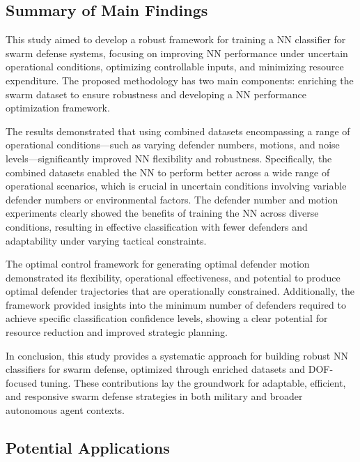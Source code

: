 \documentclass[journal]{IEEEtran} %
\begin{document}
\subsection{Summary of Main Findings}


This study aimed to develop a robust framework for training a NN classifier for swarm defense systems, focusing on improving NN performance under uncertain operational conditions, optimizing controllable inputs, and minimizing resource expenditure. The proposed methodology has two main components: enriching the swarm dataset to ensure robustness and developing a NN performance optimization framework.

The results demonstrated that using combined datasets encompassing a range of operational conditions—such as varying defender numbers, motions, and noise levels—significantly improved NN flexibility and robustness. Specifically, the combined datasets enabled the NN to perform better across a wide range of operational scenarios, which is crucial in uncertain conditions involving variable defender numbers or environmental factors. The defender number and motion experiments clearly showed the benefits of training the NN across diverse conditions, resulting in effective classification with fewer defenders and adaptability under varying tactical constraints.

The optimal control framework for generating optimal defender motion demonstrated its flexibility, operational effectiveness, and potential to produce optimal defender trajectories that are operationally constrained. Additionally, the framework provided insights into the minimum number of defenders required to achieve specific classification confidence levels, showing a clear potential for resource reduction and improved strategic planning.

In conclusion, this study provides a systematic approach for building robust NN classifiers for swarm defense, optimized through enriched datasets and DOF-focused tuning. These contributions lay the groundwork for adaptable, efficient, and responsive swarm defense strategies in both military and broader autonomous agent contexts.


\subsection{Potential Applications}
\end{document}
